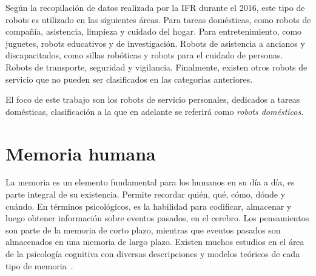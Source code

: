 Según la recopilación de datos realizada por la IFR durante el 2016, este tipo de robots es utilizado en las siguientes áreas. Para tareas domésticas, como robots de compañía, asistencia, limpieza y cuidado del hogar. Para entretenimiento, como juguetes, robots educativos y de investigación. Robots de asistencia a ancianos y discapacitados, como sillas robóticas y robots para el cuidado de personas. Robots de transporte, seguridad y vigilancia. Finalmente, existen otros robots de servicio que no pueden ser clasificados en las categorías anteriores.

El foco de este trabajo son los robots de servicio personales, dedicados a tareas domésticas, clasificación a la que en  adelante se referirá como \textit{robots domésticos}.










\section{Memoria humana}\label{sec:human_memory}

La memoria es un elemento fundamental para los humanos en su día a día, es parte integral de su existencia. Permite recordar quién, qué, cómo, dónde y cuándo. En términos psicológicos, es la habilidad para codificar, almacenar y luego obtener información sobre eventos pasados, en el cerebro. Los pensamientos son parte de la memoria de corto plazo, mientras que eventos pasados son almacenados en una memoria de largo plazo. Existen muchos estudios en el área de la psicología cognitiva con diversas descripciones y modelos teóricos de cada tipo de memoria~\cite{Vijayakumar2014}.

